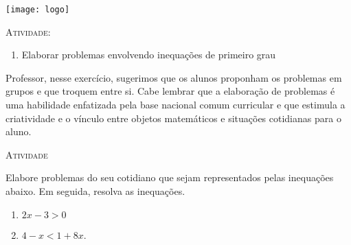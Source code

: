 \documentclass[10 pt,usenames,dvipsnames, oneside]{article}
\begin{document}
\begin{center}
  \begin{minipage}[l]{3cm}
\texttt{[image: logo]}    
\end{minipage}\hfill
\begin{minipage}[r]{.8\textwidth}
 {\Large \scshape Atividade: }  
\end{minipage}
\end{center}
\vspace{.2cm}

\ifdefined\prof

\begin{goals}
\begin{enumerate}
\item Elaborar problemas envolvendo inequações de primeiro grau
\end{enumerate}

\tcblower

Professor, nesse exercício, sugerimos que os alunos proponham os problemas em grupos e que troquem entre si. Cabe lembrar que a elaboração de problemas é uma habilidade enfatizada pela base nacional comum curricular e que estimula a criatividade e o vínculo entre objetos matemáticos e situações cotidianas para o aluno.
\end{goals}

\bigskip
\begin{center}
{\large \scshape Atividade}
\end{center}
\fi
Elabore problemas do seu cotidiano que sejam representados pelas inequações abaixo. Em seguida, resolva as inequações.
\begin{enumerate}
\item{}
$2x - 3 > 0$

\item{}
$4  - x < 1 + 8x$.
\end{enumerate}




\end{document}

